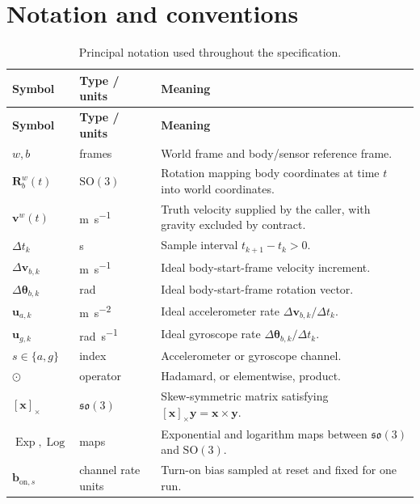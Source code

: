 \documentclass[11pt,oneside,headings=big]{scrreprt}
\newcommand{\Rwb}[1][]{\mathbf{R}^{w}_{b#1}}
\newcommand{\Exp}{\operatorname{Exp}}
\newcommand{\Log}{\operatorname{Log}}
\newcommand{\skewmat}[1]{\left[#1\right]_{\times}}
\newcommand{\Had}{\odot}
\newcommand{\vect}[1]{\bm{#1}}
\begin{document}
    \chapter*{Notation and conventions}
    \begin{longtable}{@{}L{1.35in}L{1.45in}L{3.35in}@{}}
        \caption{Principal notation used throughout the specification.}\label{tab:notation}\\
        \toprule
        \textbf{Symbol} & \textbf{Type / units} & \textbf{Meaning} \\
        \midrule
        \endfirsthead
        \toprule
        \textbf{Symbol} & \textbf{Type / units} & \textbf{Meaning} \\
        \midrule
        \endhead
        $w,b$ & frames & World frame and body/sensor reference frame. \\
        $\Rwb(t)$ & $\mathrm{SO}(3)$ & Rotation mapping body coordinates at time $t$ into world coordinates. \\
        $\vect v^w(t)$ & \si{\meter\per\second} & Truth velocity supplied by the caller, with gravity excluded by contract. \\
        $\Delta t_k$ & \si{\second} & Sample interval $t_{k+1}-t_k>0$. \\
        $\Delta\vect v_{b,k}$ & \si{\meter\per\second} & Ideal body-start-frame velocity increment. \\
        $\Delta\vect\theta_{b,k}$ & \si{\radian} & Ideal body-start-frame rotation vector. \\
        $\vect u_{a,k}$ & \si{\meter\per\second\squared} & Ideal accelerometer rate $\Delta\vect v_{b,k}/\Delta t_k$. \\
        $\vect u_{g,k}$ & \si{\radian\per\second} & Ideal gyroscope rate $\Delta\vect\theta_{b,k}/\Delta t_k$. \\
        $s\in\{a,g\}$ & index & Accelerometer or gyroscope channel. \\
        $\Had$ & operator & Hadamard, or elementwise, product. \\
        $\skewmat{\vect x}$ & $\mathfrak{so}(3)$ & Skew-symmetric matrix satisfying $\skewmat{\vect x}\vect y=\vect x\times\vect y$. \\
        $\Exp,\Log$ & maps & Exponential and logarithm maps between $\mathfrak{so}(3)$ and $\mathrm{SO}(3)$. \\
        $\vect b_{\mathrm{on},s}$ & channel rate units & Turn-on bias sampled at reset and fixed for one run. \\

\end{longtable}
\end{document}
